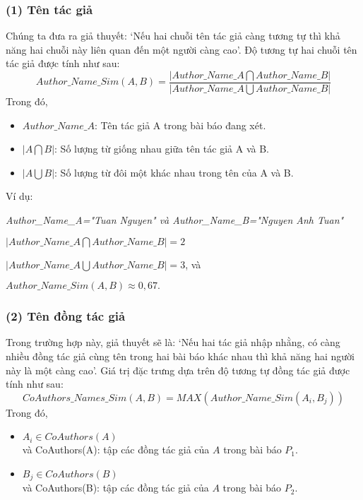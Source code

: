\subsubsection*{(1) Tên tác giả}
Chúng ta đưa ra giả thuyết: `Nếu hai chuỗi tên tác giả càng tương tự thì khả năng hai chuỗi này liên quan đến một người càng cao'. Độ tương tự hai chuỗi tên tác giả được tính như sau:
\begin{equation}
Author\_Name\_Sim(A,B) = \displaystyle\frac{|Author\_Name\_A \bigcap Author\_Name\_B|}{|Author\_Name\_A \bigcup Author\_Name\_B|} 
\end{equation}
Trong đó,
\begin{itemize}
\item $Author\_Name\_A$: Tên tác giả A trong bài báo đang xét.
\item $|A \bigcap B|$: Số lượng từ giống nhau giữa tên tác giả A và B.
\item $|A \bigcup B|$: Số lượng từ đôi một khác nhau trong tên của A và B.
\end{itemize}
Ví dụ:

\emph{Author\_Name\_A="Tuan Nguyen" và Author\_Name\_B="Nguyen Anh Tuan"}

\emph{$|Author\_Name\_A \bigcap Author\_Name\_B| = 2$}

$|Author\_Name\_A \bigcup Author\_Name\_B |= 3$, và

$Author\_Name\_Sim(A, B) \approx  0,67.$\\

\subsubsection*{(2) Tên đồng tác giả}
Trong trường hợp này, giả thuyết sẽ là: `Nếu hai tác giả nhập nhằng, có càng nhiều đồng tác giả cùng tên trong hai bài báo khác nhau thì khả năng hai người này là một càng cao'. Giá trị đặc trưng dựa trên độ tương tự đồng tác giả được tính như sau:
\begin{equation}
CoAuthors\_Names\_Sim(A,B) = MAX(Author\_Name\_Sim(A_{i},B_{j}))
\end{equation}
Trong đó,
\begin{itemize}
\item $A_{i}\in {CoAuthors(A)}$ \\
và CoAuthors(A): tập các đồng tác giả của $A$ trong bài báo  $P_{1}$.
\item $B_{j}\in {CoAuthors(B)}$ \\
và CoAuthors(B): tập các đồng tác giả của $A$ trong bài báo  $P_{2}$.
\end{itemize}

